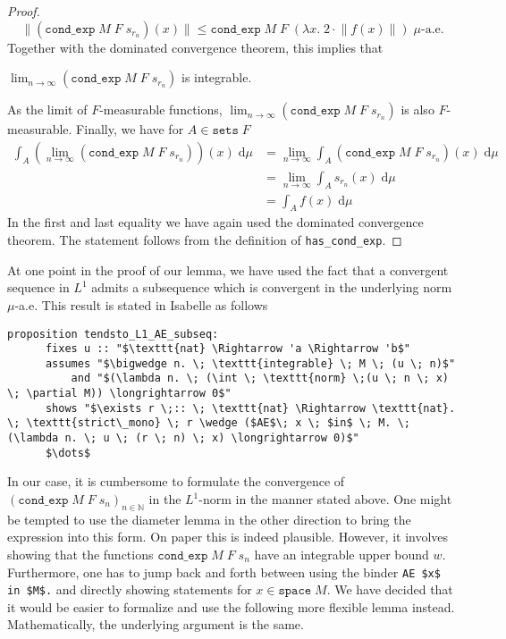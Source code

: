 \begin{proof}
	\[
		\lVert (\texttt{cond\_exp} \; M \; F \; s_{r_n}) (x) \rVert \le \texttt{cond\_exp} \; M \; F \; (\lambda x. \; 2 \cdot \lVert f(x)\rVert) \; \mu\textrm{-a.e.}
	\]
	Together with the dominated convergence theorem, this implies that \par\noindent$\lim_{n \to \infty} (\texttt{cond\_exp} \; M \; F \; s_{r_n})$ is integrable. \par\noindent As the limit of $F$-measurable functions, $\lim_{n \to \infty} (\texttt{cond\_exp} \; M \; F \; s_{r_n})$ is also $F$-measurable. Finally, we have for $A \in \texttt{sets} \; F$
	\begin{align*}
		\int_A (\lim_{n \to \infty} (\texttt{cond\_exp} \; M \; F \; s_{r_n}))(x) \; \textrm{d}\mu &= \lim_{n \to \infty} \int_A (\texttt{cond\_exp} \; M \; F \; s_{r_n})(x) \; \textrm{d}\mu \\
		&= \lim_{n \to \infty} \int_A s_{r_n}(x) \; \textrm{d}\mu \\
		&= \int_A f(x) \; \textrm{d}\mu 
	\end{align*}
	In the first and last equality we have again used the dominated convergence theorem. The statement follows from the definition of \texttt{has\_cond\_exp}.
\end{proof}

At one point in the proof of our lemma, we have used the fact that a convergent sequence in $L^1$ admits a subsequence which is convergent in the underlying norm $\mu$-a.e. This result is stated in Isabelle as follows

{\small
	\begin{lstlisting}[style=isabelle]
	proposition tendsto_L1_AE_subseq:
	  fixes u :: "$\texttt{nat} \Rightarrow 'a \Rightarrow 'b$"
	  assumes "$\bigwedge n. \; \texttt{integrable} \; M \; (u \; n)$"
		  and "$(\lambda n. \; (\int \; \texttt{norm} \;(u \; n \; x) \; \partial M)) \longrightarrow 0$"
	  shows "$\exists r \;:: \; \texttt{nat} \Rightarrow \texttt{nat}. \; \texttt{strict\_mono} \; r \wedge ($AE$\; x \; $in$ \; M. \; (\lambda n. \; u \; (r \; n) \; x) \longrightarrow 0)$"
	  $\dots$
	\end{lstlisting}
}

In our case, it is cumbersome to formulate the convergence of $(\texttt{cond\_exp} \; M \; F \; s_n)_{n \in \mathbb{N}}$ in the $L^1$-norm in the manner stated above. One might be tempted to use the diameter lemma in the other direction to bring the expression into this form. On paper this is indeed plausible. However, it involves showing that the functions $\texttt{cond\_exp} \; M \; F \; s_n$ have an integrable upper bound $w$. Furthermore, one has to jump back and forth between using the binder \lstinline[mathescape]{AE $x$ in $M$.} and directly showing statements for $x \in \texttt{space} \; M$. We have decided that it would be easier to formalize and use the following more flexible lemma instead. Mathematically, the underlying argument is the same.

